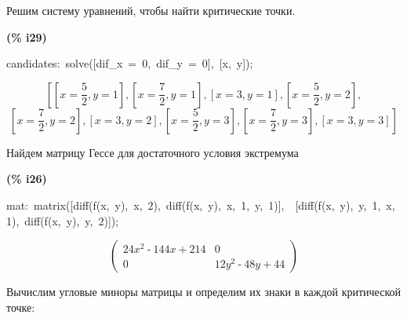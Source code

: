 \documentclass[a4paper, 12pt]{article}
\begin{document}
\noindent
Решим систему уравнений, чтобы найти критические точки.

\begin{minipage}[t]{4.000000em}\color{red}\bfseries
(\% i29)	
\end{minipage}

\begin{minipage}[t]{\textwidth}\color{blue}
candidates:\ solve([dif\_x\ =\ 0,\ dif\_y\ =\ 0],\ [x,\ y]);
\end{minipage}
\[\displaystyle \tag{candidates} 
\operatorname{[}\left[ x\operatorname{=}\frac{5}{2}\operatorname{,}y\operatorname{=}1\right] \operatorname{,}\left[ x\operatorname{=}\frac{7}{2}\operatorname{,}y\operatorname{=}1\right] \operatorname{,}\left[ x\operatorname{=}3\operatorname{,}y\operatorname{=}1\right] \operatorname{,
}\left[ x\operatorname{=}\frac{5}{2}\operatorname{,}y\operatorname{=}2\right] \operatorname{,}\]
\[\left[ x\operatorname{=}\frac{7}{2}\operatorname{,}y\operatorname{=}2\right] \operatorname{,}\left[ x\operatorname{=}3\operatorname{,}y\operatorname{=}2\right] \operatorname{,}\left[ x\operatorname{=}\frac{5}{2}\operatorname{,}y\operatorname{=}3\right] \operatorname{,
}\left[ x\operatorname{=}\frac{7}{2}\operatorname{,}y\operatorname{=}3\right] \operatorname{,}\left[ x\operatorname{=}3\operatorname{,}y\operatorname{=}3\right] \operatorname{]}\mbox{}
\]

Найдем матрицу Гессе для достаточного условия экстремума

\noindent
\begin{minipage}[t]{4.000000em}\color{red}\bfseries
(\% i26)	
\end{minipage}
\begin{minipage}[t]{\textwidth}\color{blue}
mat:\ matrix([diff(f(x,\ y),\ x,\ 2),\ diff(f(x,\ y),\ x,\ 1,\ y,\ 1)],\ \ [diff(f(x,\ y),\ y,\ 1,\ x,\ 1),\ diff(f(x,\ y),\ y,\ 2)]);\\

\end{minipage}
\[\displaystyle \tag{mat} 
\begin{pmatrix}24 {{x}^{2}}\operatorname{-}144 x\operatorname{+}214 & 0\\
0 & 12 {{y}^{2}}\operatorname{-}48 y\operatorname{+}44\end{pmatrix}\mbox{}
\]


\noindent
Вычислим угловые миноры матрицы и определим их знаки в каждой критической точке:
\end{document}
